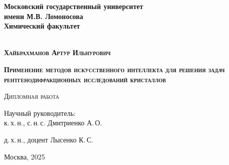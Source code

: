 \begin{titlepage}
\newpage

\begin{center}

\textbf{Московский государственный университет\\ имени М.В. Ломоносова}\\
\textbf{Химический факультет}\\
\\
\end{center}
\vspace{1cm}


\vspace{8em}
\begin{center}
\textsc{\textbf{Хайбрахманов Артур Ильнурович}}
\vspace{1cm}


\textsc{\textbf{\large Применение методов искусственного интеллекта для решения задач рентгенодифракционных исследований кристаллов}}


\vspace{1em}

\textsc{Дипломная работа}
\end{center}
\vspace{7em}
\begin{flushright}
Научный руководитель:\\
к.\,х.\,н., с.\,н.\,с. Дмитриенко А.\,О.

д.\,х.\,н., доцент Лысенко К.\,С.

\end{flushright}

\vspace{\fill}

\begin{center}
Москва, 2025
\end{center}

\end{titlepage}
